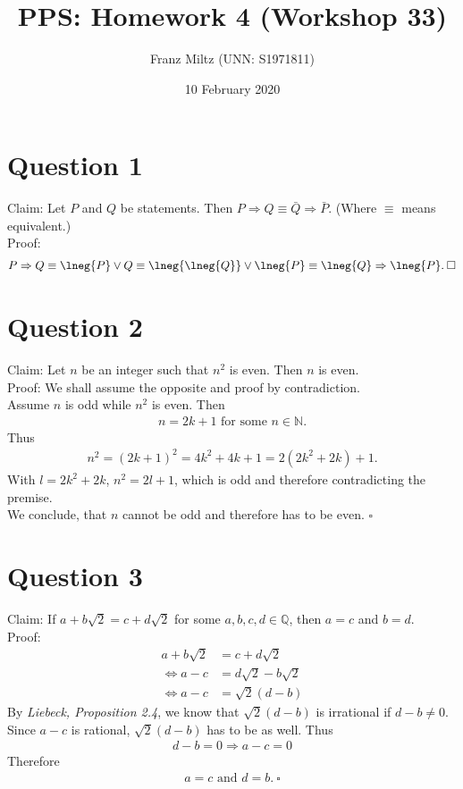 \documentclass{article}
\title{PPS: Homework 4 (Workshop 33)}
\author{Franz Miltz (UNN: S1971811)}
\date{10 February 2020}
\begin{document}
\maketitle
\section*{Question 1}
Claim: Let $P$ and $Q$ be statements. Then $P\Rightarrow Q\equiv \bar{Q}\Rightarrow \bar{P}$. (Where $\equiv$ means equivalent.)\\
Proof:
\begin{align*}
  P\Rightarrow Q\equiv\lneg{P}\vee Q\equiv \lneg{\lneg{Q}}\vee \lneg{P}\equiv\lneg{Q}\Rightarrow\lneg{P}.\:\square
\end{align*}
\section*{Question 2}
Claim: Let $n$ be an integer such that $n^2$ is even. Then $n$ is even.\\
Proof: We shall assume the opposite and proof by contradiction.\\
Assume $n$ is odd while $n^2$ is even. Then
\begin{align*}
  n=2k+1 \text{ for some } n\in\mathbb{N}. 
\end{align*} 
Thus
\begin{align*}
  n^2=(2k+1)^2=4k^2+4k+1=2(2k^2+2k)+1.
\end{align*}
With $l=2k^2+2k$, $n^2=2l+1$, which is odd and therefore contradicting the premise.\\
We conclude, that $n$ cannot be odd and therefore has to be even. $\square$
\section*{Question 3}
Claim: If $a+b\sqrt{2}=c+d\sqrt{2}$ for some $a,b,c,d\in\mathbb{Q}$, then $a=c$ and $b=d$.\\
Proof:
\begin{align*}
  a+b\sqrt{2}&=c+d\sqrt{2}\\
  \Leftrightarrow a-c&=d\sqrt{2}-b\sqrt{2}\\
  \Leftrightarrow a-c&=\sqrt{2}(d-b)
\end{align*}
By \emph{Liebeck, Proposition 2.4}, we know that $\sqrt{2}(d-b)$ is irrational if $d-b\not=0$. Since $a-c$ is rational, $\sqrt{2}(d-b)$ has to be as well. Thus
\begin{align*}
  d-b=0 \Rightarrow a-c=0
\end{align*}
Therefore
\begin{align*}
  a=c \text{ and } d=b.\:\square
\end{align*}
\end{document}

